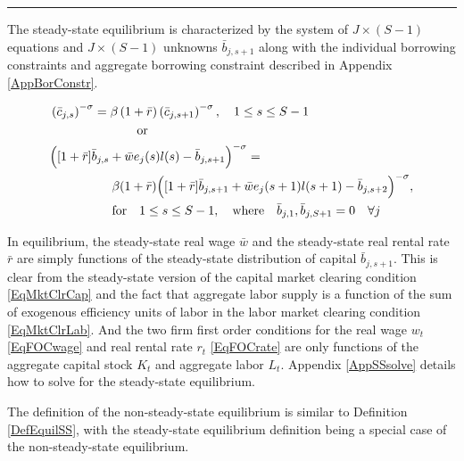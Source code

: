 \documentclass[letterpaper,12pt]{article}
\theoremstyle{definition}
\begin{document}
    \hrule
    \begin{spacing}{1.5}
    \vspace{10mm}

    The steady-state equilibrium is characterized by the system of $J\times(S-1)$ equations and $J\times(S-1)$ unknowns $\bar{b}_{j,s+1}$ along with the individual borrowing constraints and aggregate borrowing constraint described in Appendix \ref{AppBorConstr}.

    \begin{equation}\label{EqSSeuler}
      \begin{split}
        &\left(\bar{c}_{j,s}\right)^{-\sigma} = \beta \left(1+\bar{r}\right)\left(\bar{c}_{j,s+1}\right)^{-\sigma}, \quad 1\leq s\leq S-1 \\
        &\quad\quad\quad\quad\quad\quad\quad\text{or} \\
        &\Bigl([1+\bar{r}]\bar{b}_{j,s} + \bar{w}e_j(s)l(s) - \bar{b}_{j,s+1}\Bigr)^{-\sigma} = \\
        &\quad\quad\quad\quad\quad \beta(1+\bar{r})\Bigl([1+\bar{r}]\bar{b}_{j,s+1} + \bar{w}e_j(s+1)l(s+1) - \bar{b}_{j,s+2}\Bigr)^{-\sigma}, \\
        &\quad\quad\quad\quad\quad \text{for} \quad 1\leq s\leq S-1,\quad\text{where}\quad \bar{b}_{j,1},\bar{b}_{j,S+1} = 0 \quad\forall j
      \end{split}
    \end{equation}

    In equilibrium, the steady-state real wage $\bar{w}$ and the steady-state real rental rate $\bar{r}$ are simply functions of the steady-state distribution of capital $\bar{b}_{j,s+1}$. This is clear from the steady-state version of the capital market clearing condition \eqref{EqMktClrCap} and the fact that aggregate labor supply is a function of the sum of exogenous efficiency units of labor in the labor market clearing condition \eqref{EqMktClrLab}. And the two firm first order conditions for the real wage $w_t$ \eqref{EqFOCwage} and real rental rate $r_t$ \eqref{EqFOCrate} are only functions of the aggregate capital stock $K_t$ and aggregate labor $L_t$. Appendix \ref{AppSSsolve} details how to solve for the steady-state equilibrium.

    The definition of the non-steady-state equilibrium is similar to Definition \ref{DefEquilSS}, with the steady-state equilibrium definition being a special case of the non-steady-state equilibrium.

    \vspace{7mm}
    \end{spacing}
\end{document}
